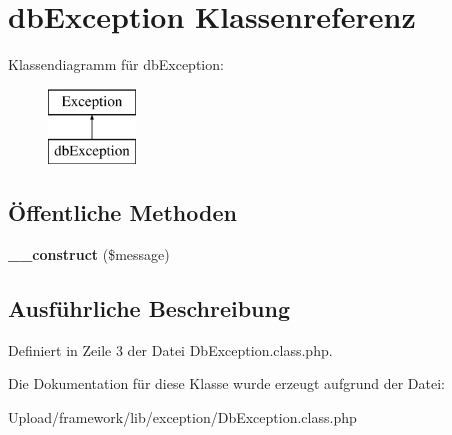 \hypertarget{classdb_exception}{}\section{db\+Exception Klassenreferenz}
\label{classdb_exception}
Klassendiagramm für db\+Exception\+:\begin{figure}[H]
\begin{center}
\leavevmode
\includegraphics[height=2.000000cm]{classdb_exception}
\end{center}
\end{figure}
\subsection*{Öffentliche Methoden}
\begin{DoxyCompactItemize}
\item 
\mbox{\label{classdb_exception_a3ce56a92fea0bd57822d510720951e97}} 
{\bfseries \+\_\+\+\_\+construct} (\$message)
\end{DoxyCompactItemize}


\subsection{Ausführliche Beschreibung}


Definiert in Zeile 3 der Datei Db\+Exception.\+class.\+php.



Die Dokumentation für diese Klasse wurde erzeugt aufgrund der Datei\+:\begin{DoxyCompactItemize}
\item 
Upload/framework/lib/exception/Db\+Exception.\+class.\+php\end{DoxyCompactItemize}
